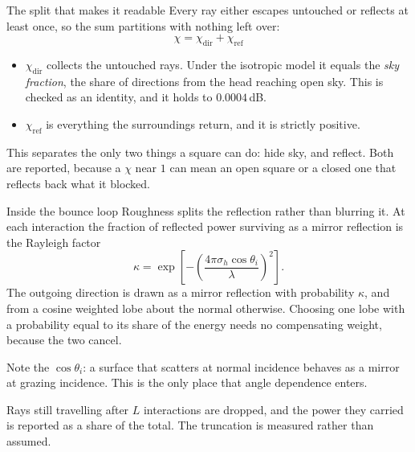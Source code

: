 \documentclass[aspectratio=169,11pt]{beamer}
\begin{document}
\begin{frame}{The split that makes it readable}
  Every ray either escapes untouched or reflects at least once, so the sum
  partitions with nothing left over:
  \begin{equation*}
    \boxed{\;\chi = \chi_{\mathrm{dir}} + \chi_{\mathrm{ref}}\;}
  \end{equation*}
  \begin{itemize}
    \item $\chi_{\mathrm{dir}}$ collects the untouched rays. Under the isotropic
      model it equals the \emph{sky fraction}, the share of directions from the
      head reaching open sky. This is checked as an identity, and it holds to
      $0.0004$\,dB.
    \item $\chi_{\mathrm{ref}}$ is everything the surroundings return, and it is
      strictly positive.
  \end{itemize}
  \vspace{0.5em}
  This separates the only two things a square can do: hide sky, and reflect.
  Both are reported, because a $\chi$ near $1$ can mean an open square or a
  closed one that reflects back what it blocked.
\end{frame}

\begin{frame}{Inside the bounce loop}
  Roughness splits the reflection rather than blurring it. At each interaction
  the fraction of reflected power surviving as a mirror reflection is the
  Rayleigh factor
  \begin{equation*}
    \kappa = \exp\!\left[-\left(\frac{4\pi \sigma_h \cos\theta_i}{\lambda}\right)^{\!2}\right] .
  \end{equation*}
  The outgoing direction is drawn as a mirror reflection with probability
  $\kappa$, and from a cosine weighted lobe about the normal otherwise. Choosing
  one lobe with a probability equal to its share of the energy needs no
  compensating weight, because the two cancel.

  \vspace{0.5em}
  Note the $\cos\theta_i$: a surface that scatters at normal incidence behaves as
  a mirror at grazing incidence. This is the only place that angle dependence
  enters.

  \vspace{0.5em}
  Rays still travelling after $L$ interactions are dropped, and the power they
  carried is reported as a share of the total. The truncation is measured rather
  than assumed.
\end{frame}
\end{document}
